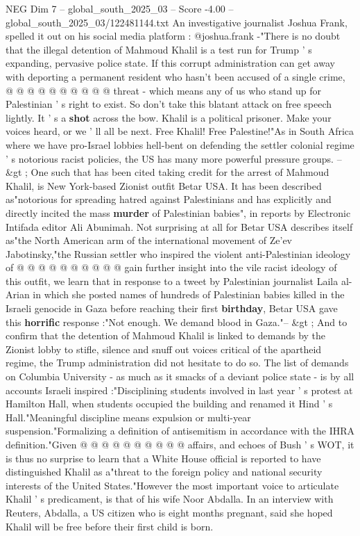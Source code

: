 \begin{textsample}{NEG Dim 7 – global\_south\_2025\_03 – Score -4.00 – global\_south\_2025\_03/122481144.txt}
An investigative journalist Joshua Frank, spelled it out on his social media platform : @joshua.frank -"There is no doubt that the illegal detention of Mahmoud Khalil is a test run for Trump ' s expanding, pervasive police state.
If this corrupt administration can get away with deporting a permanent resident who hasn't been accused of a single crime, @ @ @ @ @ @ @ @ @ @ threat - which means any of us who stand up for Palestinian ' s right to exist.
So don't take this blatant attack on free speech lightly.
It ' s a \textbf{shot} across the bow.
Khalil is a political prisoner.
Make your voices heard, or we ' ll all be next.
Free Khalil!
Free Palestine!"As in South Africa where we have pro-Israel lobbies hell-bent on defending the settler colonial regime ' s notorious racist policies, the US has many more powerful pressure groups. -- \&gt ; One such that has been cited taking credit for the arrest of Mahmoud Khalil, is New York-based Zionist outfit Betar USA.
It has been described as"notorious for spreading hatred against Palestinians and has explicitly and directly incited the mass \textbf{murder} of Palestinian babies", in reports by Electronic Intifada editor Ali Abunimah.
Not surprising at all for Betar USA describes itself as"the North American arm of the international movement of Ze'ev Jabotinsky,"the Russian settler who inspired the violent anti-Palestinian ideology of @ @ @ @ @ @ @ @ @ @ gain further insight into the vile racist ideology of this outfit, we learn that in response to a tweet by Palestinian journalist Laila al-Arian in which she posted names of hundreds of Palestinian babies killed in the Israeli genocide in Gaza before reaching their first \textbf{birthday}, Betar USA gave this \textbf{horrific} response :"Not enough.
We demand blood in Gaza."-- \&gt ; And to confirm that the detention of Mahmoud Khalil is linked to demands by the Zionist lobby to stifle, silence and snuff out voices critical of the apartheid regime, the Trump administration did not hesitate to do so.
The list of demands on Columbia University - as much as it smacks of a deviant police state - is by all accounts Israeli inspired :"Disciplining students involved in last year ' s protest at Hamilton Hall, when students occupied the building and renamed it Hind ' s Hall."Meaningful discipline means expulsion or multi-year suspension."Formalizing a definition of antisemitism in accordance with the IHRA definition."Given @ @ @ @ @ @ @ @ @ @ affairs, and echoes of Bush ' s WOT, it is thus no surprise to learn that a White House official is reported to have distinguished Khalil as a"threat to the foreign policy and national security interests of the United States."However the most important voice to articulate Khalil ' s predicament, is that of his wife Noor Abdalla.
In an interview with Reuters, Abdalla, a US citizen who is eight months pregnant, said she hoped Khalil will be free before their first child is born.

\end{textsample}
